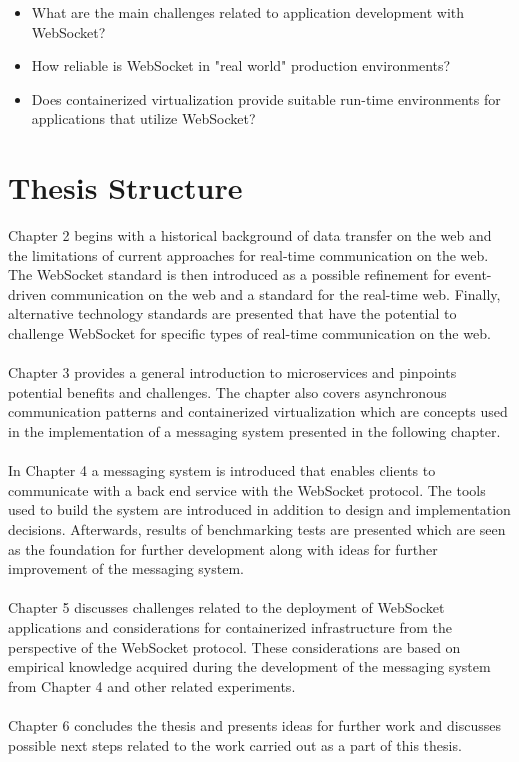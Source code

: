 \begin{itemize}
\item What are the main challenges related to application development with WebSocket?
\item How reliable is WebSocket in "real world" production environments?
\item Does containerized virtualization provide suitable run-time environments for applications that utilize WebSocket?
\end{itemize}

\section{Thesis Structure}

Chapter 2 begins with a historical background of data transfer on the web and the limitations of current approaches for real-time communication on the web. The WebSocket standard is then introduced as a possible refinement for event-driven communication on the web and a standard for the real-time web. Finally, alternative technology standards are presented that have the potential to challenge WebSocket for specific types of real-time communication on the web.
\\ \\
Chapter 3 provides a general introduction to microservices and pinpoints potential benefits and challenges. The chapter also covers asynchronous communication patterns and containerized virtualization which are concepts used in the implementation of a messaging system presented in the following chapter.
\\ \\
In Chapter 4 a messaging system is introduced that enables clients to communicate with a back end service with the WebSocket protocol. The tools used to build the system are introduced in addition to design and implementation decisions. Afterwards, results of benchmarking tests are presented which are seen as the foundation for further development along with ideas for further improvement of the messaging system.
\\ \\
Chapter 5 discusses challenges related to the deployment of WebSocket applications and considerations for containerized infrastructure from the perspective of the WebSocket protocol. These considerations are based on empirical knowledge acquired during the development of the messaging system from Chapter 4 and other related experiments.
\\ \\
Chapter 6 concludes the thesis and presents ideas for further work and discusses possible next steps related to the work carried out as a part of this thesis.